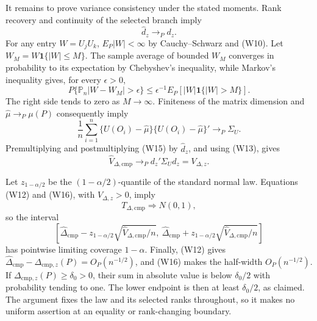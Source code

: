It remains to prove variance consistency under the stated moments.  Rank recovery and continuity of the selected branch imply
\[
 \widehat d_z\longrightarrow_P d_z.
\tag{W13}
\]
For any entry \(W=U_jU_k\), \(E_P|W|<\infty\) by Cauchy--Schwarz and (W10).  Let \(W_M=W\mathbf 1\{|W|\le M\}\).  The sample average of bounded \(W_M\) converges in probability to its expectation by Chebyshev's inequality, while Markov's inequality gives, for every \(\epsilon>0\),
\[
 P\{\mathbb P_n|W-W_M|>\epsilon\}
 \le \epsilon^{-1}E_P[|W|\mathbf 1\{|W|>M\}].
\tag{W14}
\]
The right side tends to zero as \(M\to\infty\).  Finiteness of the matrix dimension and \(\widehat\mu\to_P\mu(P)\) consequently imply
\[
 \frac1n\sum_{i=1}^n
 \{U(O_i)-\widehat\mu\}\{U(O_i)-\widehat\mu\}'
 \longrightarrow_P\Sigma_U.
\tag{W15}
\]
Premultiplying and postmultiplying (W15) by \(\widehat d_z\), and using (W13), gives
\[
 \widehat V_{\Delta,\mathrm{cmp}}
 \longrightarrow_P d_z'\Sigma_Ud_z=V_{\Delta,z}.
\tag{W16}
\]

Let \(z_{1-\alpha/2}\) be the \((1-\alpha/2)\)-quantile of the standard normal law.  Equations (W12) and (W16), with \(V_{\Delta,z}>0\), imply
\[
 T_{\Delta,\mathrm{cmp}}\Rightarrow N(0,1),
\]
so the interval
\[
 \left[\widehat\Delta_{\mathrm{cmp}}
 -z_{1-\alpha/2}\sqrt{\widehat V_{\Delta,\mathrm{cmp}}/n},\ 
 \widehat\Delta_{\mathrm{cmp}}
 +z_{1-\alpha/2}\sqrt{\widehat V_{\Delta,\mathrm{cmp}}/n}\right]
\]
has pointwise limiting coverage \(1-\alpha\).  Finally, (W12) gives \(\widehat\Delta_{\mathrm{cmp}}-\Delta_{\mathrm{cmp},z}(P)=O_P(n^{-1/2})\), and (W16) makes the half-width \(O_P(n^{-1/2})\).  If \(\Delta_{\mathrm{cmp},z}(P)\ge\delta_0>0\), their sum in absolute value is below \(\delta_0/2\) with probability tending to one.  The lower endpoint is then at least \(\delta_0/2\), as claimed.  The argument fixes the law and its selected ranks throughout, so it makes no uniform assertion at an equality or rank-changing boundary.
